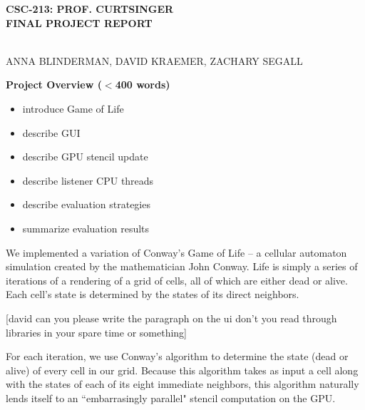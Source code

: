 \documentclass[12pt]{article}
\begin{document}
\setlength{\parindent}{4em}
\setlength{\parskip}{1em}


\newcommand{\ttspc}{\hspace{1mm}}
\newcommand{\tspc}{\hspace{2mm}}
\newcommand{\lspc}{\hspace{10mm}}
\newcommand{\ttc}{, \ttspc}
\newcommand{\nth}{^{\text{th}}}
\newcommand{\mybegit}{\vspace{-2mm} \begin{itemize} \itemsep-.6em }
\newcommand{\mytitle}[1]{\vspace{10mm} \noindent\begin{large} \textbf{{#1}} \end{large}} 




\begin{center}
\begin{Large} \textbf{CSC-213: PROF. CURTSINGER} \\
\vspace{3mm} \textbf{FINAL PROJECT REPORT} \end{Large} \\
\vspace{5mm} ANNA BLINDERMAN, DAVID KRAEMER, ZACHARY SEGALL
\end{center} 






\mytitle{Project Overview ($<$400 words)}
\mybegit
	\item introduce Game of Life
	\item describe GUI
	\item describe GPU stencil update
	\item describe listener CPU threads
	\item describe evaluation strategies
	\item summarize evaluation results
\end{itemize}

	We implemented a variation of Conway's Game of Life -- a cellular automaton simulation created by the mathematician John Conway. Life is simply a series of iterations of a rendering of a grid of cells, all of which are either dead or alive. Each cell's state is determined by the states of its direct neighbors. 

	[david can you please write the paragraph on the ui don't you read through libraries in your spare time or something]
	
	For each iteration, we use Conway's algorithm to determine the state (dead or alive) of every cell in our grid. Because this algorithm takes as input a cell along with the states of each of its eight immediate neighbors, this algorithm naturally lends itself to an ``embarrasingly parallel" stencil computation on the GPU.
	
\end{document}
